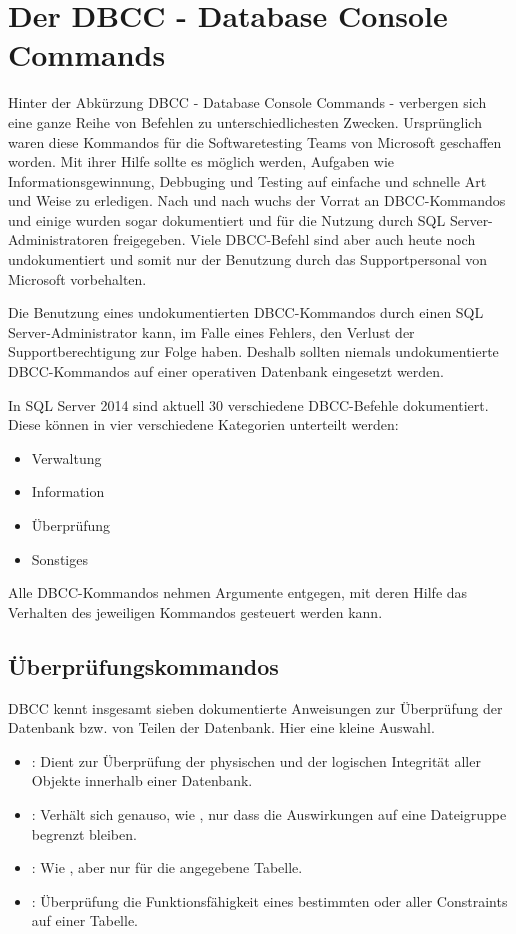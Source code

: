     \section{Der DBCC - Database Console Commands}
      Hinter der Abkürzung DBCC - Database Console Commands - verbergen sich
      eine ganze Reihe von Befehlen zu unterschiedlichesten Zwecken.
      Ursprünglich waren diese Kommandos für die Softwaretesting Teams von
      Microsoft geschaffen worden. Mit ihrer Hilfe sollte es möglich
      werden, Aufgaben wie Informationsgewinnung, Debbuging und Testing auf
      einfache und schnelle Art und Weise zu erledigen. Nach und nach wuchs
      der Vorrat an DBCC-Kommandos und einige wurden sogar dokumentiert und
      für die Nutzung durch SQL Server-Administratoren freigegeben. Viele
      DBCC-Befehl sind aber auch heute noch undokumentiert und somit nur der
      Benutzung durch das Supportpersonal von Microsoft vorbehalten.
      \begin{merke}
        Die Benutzung eines undokumentierten DBCC-Kommandos durch einen SQL
        Server-Administrator kann, im Falle eines Fehlers, den Verlust der
        Supportberechtigung zur Folge haben. Deshalb sollten niemals
        undokumentierte DBCC-Kommandos auf einer operativen Datenbank
        eingesetzt werden.
      \end{merke}
      In SQL Server 2014 sind aktuell 30 verschiedene DBCC-Befehle
      dokumentiert. Diese können in vier verschiedene Kategorien unterteilt
      werden:
      \begin{itemize}
          \item Verwaltung
          \item Information
          \item Überprüfung
          \item Sonstiges
      \end{itemize}
      Alle DBCC-Kommandos nehmen Argumente entgegen, mit deren Hilfe das
      Verhalten des jeweiligen Kommandos gesteuert werden kann.
      \subsection{Überprüfungskommandos}
        DBCC kennt  insgesamt sieben dokumentierte Anweisungen zur Überprüfung
        der Datenbank bzw. von Teilen der Datenbank. Hier eine kleine Auswahl.
        \begin{itemize}
          \item {}: Dient zur Überprüfung der
          physischen und der logischen Integrität aller Objekte innerhalb
          einer Datenbank.
          \item {}: Verhält sich genauso, wie
          , nur dass die Auswirkungen auf eine
          Dateigruppe begrenzt bleiben.
          \item {}: Wie , aber nur für die angegebene Tabelle.
          \item {}: Überprüfung die
          Funktionsfähigkeit eines bestimmten oder aller Constraints auf
          einer Tabelle.
        \end{itemize}
